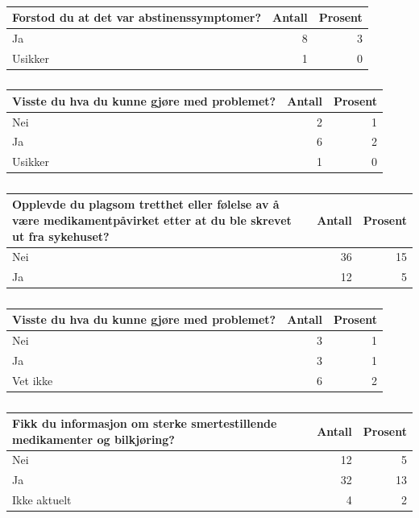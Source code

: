 \documentclass[
]{article}
\begin{document}
\begin{table}

\caption{\label{tab:opi}}
\centering
\begin{tabular}[t]{l|r|r}
\hline
Forstod du at det var abstinenssymptomer? & Antall  & Prosent\\
\hline
Ja & 8 & 3\\
\hline
Usikker & 1 & 0\\
\hline
\end{tabular}
\end{table}

\begin{table}

\caption{\label{tab:opi}}
\centering
\begin{tabular}[t]{l|r|r}
\hline
Visste du hva du kunne gjøre med problemet? & Antall  & Prosent\\
\hline
Nei & 2 & 1\\
\hline
Ja & 6 & 2\\
\hline
Usikker & 1 & 0\\
\hline
\end{tabular}
\end{table}

\begin{table}

\caption{\label{tab:opi}}
\centering
\begin{tabular}[t]{l|r|r}
\hline
Opplevde du plagsom tretthet eller følelse av å være medikamentpåvirket etter at du ble skrevet ut fra sykehuset? & Antall  & Prosent\\
\hline
Nei & 36 & 15\\
\hline
Ja & 12 & 5\\
\hline
\end{tabular}
\end{table}

\begin{table}

\caption{\label{tab:opi}}
\centering
\begin{tabular}[t]{l|r|r}
\hline
Visste du hva du kunne gjøre med problemet? & Antall  & Prosent\\
\hline
Nei & 3 & 1\\
\hline
Ja & 3 & 1\\
\hline
Vet ikke & 6 & 2\\
\hline
\end{tabular}
\end{table}

\begin{table}

\caption{\label{tab:opi}}
\centering
\begin{tabular}[t]{l|r|r}
\hline
Fikk du informasjon om sterke smertestillende medikamenter og bilkjøring? & Antall  & Prosent\\
\hline
Nei & 12 & 5\\
\hline
Ja & 32 & 13\\
\hline
Ikke aktuelt & 4 & 2\\
\hline
\end{tabular}
\end{table}
\end{document}
